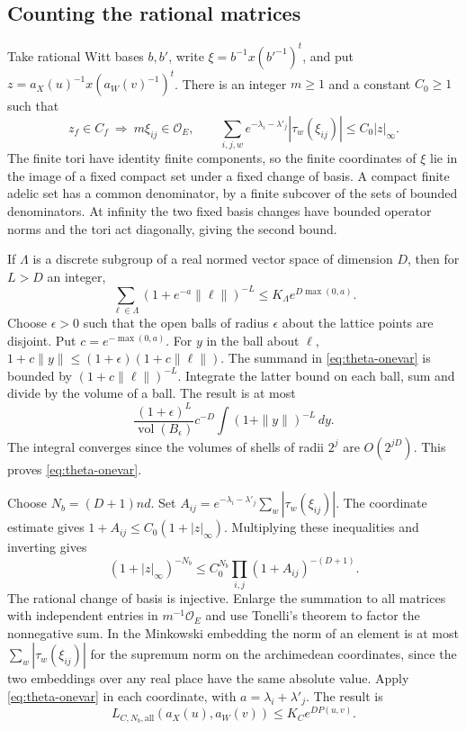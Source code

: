 \subsection{Counting the rational matrices}

Take rational Witt bases \(b,b'\), write \(\xi=b^{-1}x(b'^{-1})^t\),
and put \(z=a_X(u)^{-1}x(a_W(v)^{-1})^t\).
There is an integer \(m\ge1\) and a constant \(C_0\ge1\) such that
\[
 z_f\in C_f\ \Longrightarrow\ m\xi_{ij}\in\mathcal O_E,\qquad
 \sum_{i,j,w} e^{-\lambda_i-\lambda'_j}|\tau_w(\xi_{ij})|
                    \le C_0|z|_\infty .
\]
The finite tori have identity finite components, so the finite
coordinates of \(\xi\) lie in the image of a fixed compact set
under a fixed change of basis. A compact finite adelic set has a
common denominator, by a finite subcover of the sets of bounded
denominators. At infinity the two fixed basis changes have bounded
operator norms and the tori act diagonally, giving the second bound.

If \(\Lambda\) is a discrete subgroup of a real normed vector
space of dimension \(D\), then for \(L>D\) an integer,
\begin{equation}
 \sum_{\ell\in\Lambda}(1+e^{-a}\|\ell\|)^{-L}
       \le K_\Lambda e^{D\max(0,a)} .
 \label{eq:theta-onevar}
\end{equation}
Choose \(\epsilon>0\) such that the open balls of radius \(\epsilon\)
about the lattice points are disjoint. Put \(c=e^{-\max(0,a)}\).
For \(y\) in the ball about \(\ell\),
\(1+c\|y\|\le(1+\epsilon)(1+c\|\ell\|)\).
The summand in \eqref{eq:theta-onevar} is bounded by
\((1+c\|\ell\|)^{-L}\). Integrate the latter bound on each ball,
sum and divide by the volume of a ball. The result is at most
\[
 \frac{(1+\epsilon)^L}{\operatorname{vol}(B_\epsilon)}
 c^{-D}\int (1+\|y\|)^{-L}\,dy .
\]
The integral converges since the volumes of shells of radii \(2^j\)
are \(O(2^{jD})\). This proves \eqref{eq:theta-onevar}.

Choose \(N_b=(D+1)nd\). Set
\(A_{ij}=e^{-\lambda_i-\lambda'_j}\sum_w|\tau_w(\xi_{ij})|\).
The coordinate estimate gives \(1+A_{ij}\le C_0(1+|z|_\infty)\).
Multiplying these inequalities and inverting gives
\[
 (1+|z|_\infty)^{-N_b}\le
       C_0^{N_b}\prod_{i,j}(1+A_{ij})^{-(D+1)} .
\]
The rational change of basis is injective. Enlarge the summation
to all matrices with independent entries in \(m^{-1}\mathcal O_E\)
and use Tonelli's theorem to factor the nonnegative sum. In the
Minkowski embedding the norm of an element is at most
\(\sum_w|\tau_w(\xi_{ij})|\) for the supremum norm on the archimedean
coordinates, since the two embeddings over any real place have the same
absolute value. Apply \eqref{eq:theta-onevar} in each coordinate,
with \(a=\lambda_i+\lambda'_j\). The result is
\begin{equation}
 L_{C,N_b,\mathrm{all}}(a_X(u),a_W(v))\le K_C e^{DP(u,v)}.
 \label{eq:theta-all-torus}
\end{equation}

